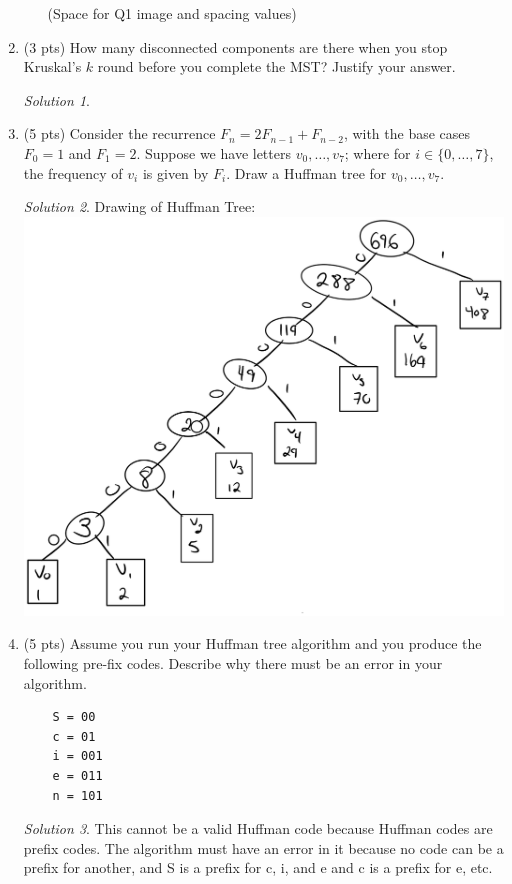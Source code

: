 \documentclass[12pt]{article}
\theoremstyle{remark}
\newtheorem*{solution}{Solution}
\begin{document}
\begin{enumerate}
\begin{enumerate}[label=(\alph*)]
(Space for Q1 image and spacing values)
\pagebreak


\end{enumerate}

\item (3 pts) How many disconnected components are there when you stop Kruskal's $k$ round before you complete the MST? Justify your answer. 
\begin{solution}

\end{solution}


\item (5 pts) Consider the recurrence $F_{n} = 2F_{n-1} + F_{n-2}$, with the base cases $F_{0} = 1$ and $F_{1} = 2$. Suppose we have letters $v_{0}, \ldots, v_{7}$; where for $i \in \{0, \ldots, 7\}$, the frequency of $v_{i}$ is given by $F_{i}$. Draw a Huffman tree for $v_{0}, \ldots, v_{7}$. 

\begin{solution}Drawing of Huffman Tree: \\
\includegraphics[scale=0.6]{PS5bQ3.png} 
\end{solution}
\pagebreak


\item (5 pts) Assume you run your Huffman tree algorithm and you produce the following pre-fix codes. Describe why there must be an error in your algorithm.
\begin{verbatim}
    S = 00
    c = 01
    i = 001
    e = 011
    n = 101
\end{verbatim}
\begin{solution}
This cannot be a valid Huffman code because Huffman codes are prefix codes. The algorithm must have an error in it because no code can be a prefix for another, and S is a prefix for c, i, and e and c is a prefix for e, etc.
\end{solution}
\pagebreak


\end{enumerate}
\end{document}
